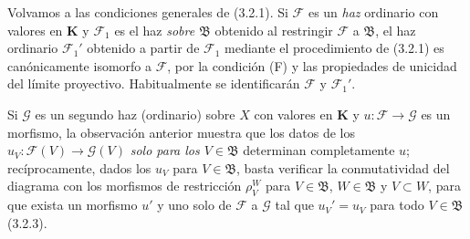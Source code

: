 \begin{env}[3.2.5]
\label{0.3.2.5-fr}
Volvamos a las condiciones generales de (3.2.1). Si $\mathcal{F}$ es un
\emph{haz} ordinario con valores en $\boldsymbol{K}$ y $\mathcal{F}_1$ es el
haz \emph{sobre $\mathfrak{B}$} obtenido al restringir $\mathcal{F}$ a
$\mathfrak{B}$, el haz ordinario $\mathcal{F}_1'$ obtenido a partir de
$\mathcal{F}_1$ mediante el procedimiento de (3.2.1) es canónicamente isomorfo a
$\mathcal{F}$, por la condición (F) y las propiedades de unicidad del
límite proyectivo. Habitualmente se identificarán $\mathcal{F}$ y
$\mathcal{F}_1'$.

Si $\mathcal{G}$ es un segundo haz (ordinario) sobre $X$ con valores en
$\boldsymbol{K}$ y $u:\mathcal{F}\to\mathcal{G}$ es un morfismo, la observación
anterior muestra que los datos de los
$u_V:\mathcal{F}(V)\to\mathcal{G}(V)$ \emph{solo para los $V\in\mathfrak{B}$}
determinan completamente $u$; recíprocamente, dados los $u_V$
para $V\in\mathfrak{B}$, basta verificar la conmutatividad del diagrama
con los morfismos de restricción $\rho_V^W$ para $V\in\mathfrak{B}$,
$W\in\mathfrak{B}$ y $V\subset W$, para que exista un morfismo $u'$ y uno
solo de $\mathcal{F}$ a $\mathcal{G}$ tal que $u_V'=u_V$ para todo
$V\in\mathfrak{B}$ (3.2.3).
\end{env}

